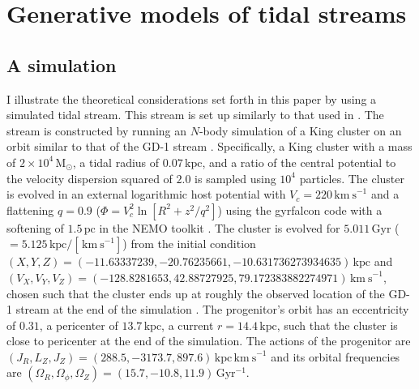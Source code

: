 \documentclass[12pt,preprint]{aastex}
\newcommand{\Gyr}{\ensuremath{\,\mathrm{Gyr}}}
\newcommand{\kpc}{\ensuremath{\,\mathrm{kpc}}}
\newcommand{\pc}{\ensuremath{\,\mathrm{pc}}}
\newcommand{\kms}{\ensuremath{\,\mathrm{km\ s}^{-1}}}
\newcommand{\msun}{\ensuremath{\,\mathrm{M}_{\odot}}}
\newcommand{\inv}{\ensuremath{^{-1}}}
\begin{document}
\section{Generative models of tidal streams}\label{sec:generative}

\subsection{A simulation}\label{sec:sim}

I illustrate the theoretical considerations set forth in this paper by
using a simulated tidal stream. This stream is set up similarly to
that used in \citet{Sanders13b}. The stream is constructed by running
an $N$-body simulation of a King cluster on an orbit similar to that
of the GD-1 stream \citep{Koposov10a}. Specifically, a King cluster
with a mass of $2\times10^4\msun$, a tidal radius of $0.07\kpc$, and a
ratio of the central potential to the velocity dispersion squared of
$2.0$ is sampled using $10^4$ particles. The cluster is evolved in an
external logarithmic host potential with $V_c = 220\kms$ and a
flattening $q=0.9$ ($\Phi = V_c^2 \ln [R^2 + z^2/q^2]$) using the
gyrfalcon code \citep{Dehnen00a,Dehnen02a} with a softening of
$1.5\pc$ in the NEMO toolkit \citep{Teuben95a}. The cluster is evolved
for $5.011\Gyr$ ($=5.125\kpc/[\kms]$) from the initial condition
$(X,Y,Z) = (-11.63337239,-20.76235661,-10.631736273934635)\kpc$ and
$(V_X,V_Y,V_Z) = (-128.8281653,42.88727925,79.172383882274971)\kms$,
chosen such that the cluster ends up at roughly the observed location
of the GD-1 stream at the end of the simulation
\citep{Koposov10a}. The progenitor's orbit has an eccentricity of
$0.31$, a pericenter of $13.7\kpc$, a current $r=14.4\kpc$, such that
the cluster is close to pericenter at the end of the simulation. The
actions of the progenitor are $(J_R,L_Z,J_Z) =
(288.5,-3173.7,897.6)\kpc\kms$ and its orbital frequencies are
$(\Omega_R,\Omega_\phi,\Omega_Z) = (15.7,-10.8,11.9)\Gyr\inv$.
\end{document}
